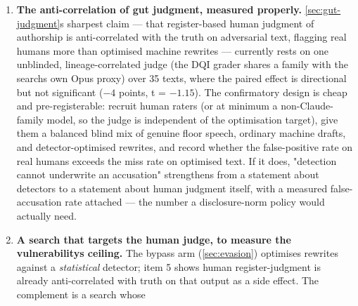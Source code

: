 \begin{enumerate}
  \textbf{The baseline must move.} A fixed model vintage would repeat the current
  debate\textquotesingle s error: work relative to dumb computers counts as obviously
  legitimate, work touching an LLM as obviously suspect. The goalpost should
  move by construction, always incorporating the best available alternative,
  because contribution means what was added over that alternative. A shrinking
  residual is correct measurement, not measurement decay. Nobody credits long
  division done by hand.

  What has to be recorded is \emph{which} baseline a given measurement was taken against. That is metadata, not a fixed target: it is what keeps an old measurement interpretable once the alternative it was taken against has been superseded. The baseline moves because the alternative keeps improving --- the same force that is collapsing measured imitation lags, though the residual and those lags are not the same quantity.
\item
  \textbf{The anti-correlation of gut judgment, measured properly.} \cref{sec:gut-judgment}\textquotesingle s
  sharpest claim --- that register-based human judgment of authorship is
  anti-correlated with the truth on adversarial text, flagging real humans
  more than optimised machine rewrites --- currently rests on one unblinded,
  lineage-correlated judge (the DQI grader shares a family with the search\textquotesingle s
  own Opus proxy) over 35 texts, where the paired effect is directional but
  not significant (\(-4\) points, t = \(-1.15\)). The confirmatory design is cheap
  and pre-registerable: recruit human raters (or at minimum a
  non-Claude-family model, so the judge is independent of the optimisation
  target), give them a balanced blind mix of genuine floor speech, ordinary
  machine drafts, and detector-optimised rewrites, and record whether the
  false-positive rate on real humans exceeds the miss rate on optimised text.
  If it does, "detection cannot underwrite an accusation" strengthens from a
  statement about detectors to a statement about human judgment itself, with
  a measured false-accusation rate attached --- the number a disclosure-norm
  policy would actually need.
\item
  \textbf{A search that targets the human judge, to measure the vulnerability\textquotesingle s
  ceiling.} The bypass arm (\cref{sec:evasion}) optimises rewrites against a \emph{statistical}
  detector; item 5 shows human register-judgment is already anti-correlated
  with truth on that output as a side effect. The complement is a search whose

\end{enumerate}
